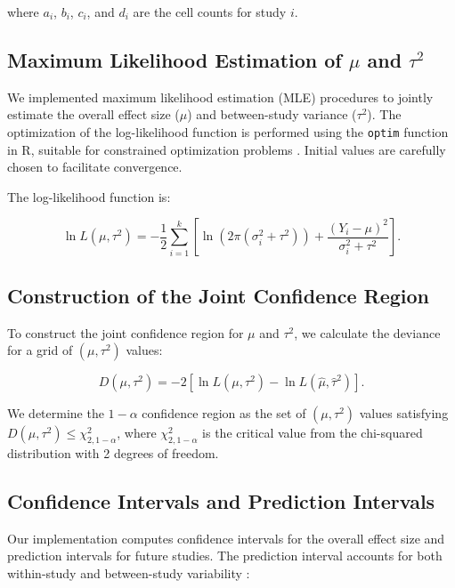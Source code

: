\documentclass[12pt,a4paper]{report}
\begin{document}
where $a_i$, $b_i$, $c_i$, and $d_i$ are the cell counts for study $i$.

\subsection{Maximum Likelihood Estimation of $\mu$ and $\tau^2$}
\label{subsec:mle_mu_tau}

We implemented maximum likelihood estimation (MLE) procedures to jointly estimate the overall effect size ($\mu$) and between-study variance ($\tau^2$). The optimization of the log-likelihood function is performed using the \texttt{optim} function in R, suitable for constrained optimization problems \citep{r_core_team2020}. Initial values are carefully chosen to facilitate convergence.

The log-likelihood function is:

\begin{equation}
\label{eq:log_likelihood}
\ln L(\mu, \tau^2) = -\frac{1}{2} \sum_{i=1}^k \left[ \ln(2\pi (\sigma_i^2 + \tau^2)) + \frac{(Y_i - \mu)^2}{\sigma_i^2 + \tau^2} \right].
\end{equation}

\subsection{Construction of the Joint Confidence Region}
\label{subsec:jcr_construction}

To construct the joint confidence region for $\mu$ and $\tau^2$, we calculate the deviance for a grid of $(\mu, \tau^2)$ values:

\begin{equation}
\label{eq:deviance_package}
D(\mu, \tau^2) = -2 \left[ \ln L(\mu, \tau^2) - \ln L(\hat{\mu}, \hat{\tau}^2) \right].
\end{equation}

We determine the $1 - \alpha$ confidence region as the set of $(\mu, \tau^2)$ values satisfying $D(\mu, \tau^2) \leq \chi^2_{2, 1 - \alpha}$, where $\chi^2_{2, 1 - \alpha}$ is the critical value from the chi-squared distribution with 2 degrees of freedom.

\subsection{Confidence Intervals and Prediction Intervals}
\label{subsec:ci_pi}

Our implementation computes confidence intervals for the overall effect size and prediction intervals for future studies. The prediction interval accounts for both within-study and between-study variability \citep{higgins2009}:
\end{document}
